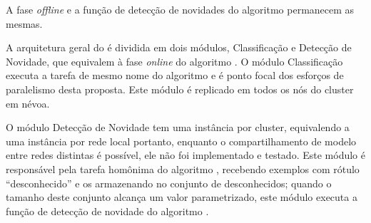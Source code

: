 A fase \emph{offline} e a função de detecção de novidades do algoritmo \minas
permanecem as mesmas.



A arquitetura geral do \mfog é dividida em dois módulos, Classificação e
Detecção de Novidade, que equivalem à fase \emph{online} do algoritmo \minas.
O módulo Classificação executa a tarefa de mesmo nome do algoritmo \minas e é
ponto focal dos esforços de paralelismo desta proposta.
Este módulo é replicado em todos os nós do cluster %
em névoa.

O módulo Detecção de Novidade tem uma instância por cluster, equivalendo a uma
instância por rede local portanto, enquanto o compartilhamento de modelo entre
redes distintas é possível, ele não foi implementado e testado.
% 
Este módulo é responsável pela tarefa homônima do algoritmo \minas, recebendo
exemplos com rótulo ``desconhecido'' e os armazenando no conjunto de
desconhecidos; quando o tamanho deste conjunto alcança um valor parametrizado,
este módulo executa a função de detecção de novidade do algoritmo \minas.

